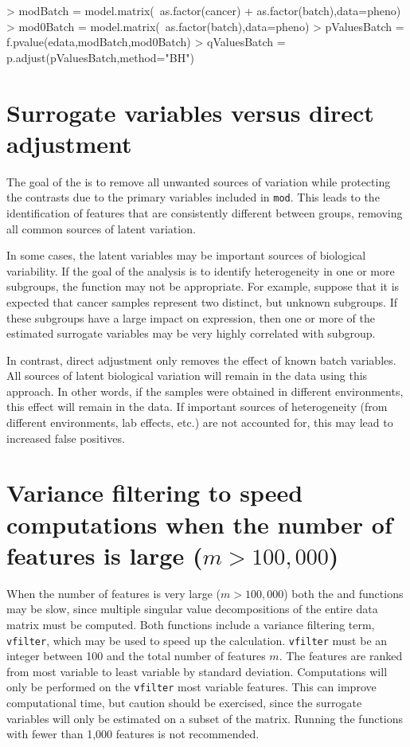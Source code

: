 \documentclass[12pt]{article}
\begin{document}
\begin{Schunk}
\begin{Sinput}
> modBatch = model.matrix(~as.factor(cancer) + as.factor(batch),data=pheno)
> mod0Batch = model.matrix(~as.factor(batch),data=pheno)
> pValuesBatch = f.pvalue(edata,modBatch,mod0Batch)
> qValuesBatch = p.adjust(pValuesBatch,method="BH")
\end{Sinput}
\end{Schunk}

\section{Surrogate variables versus direct adjustment}

The goal of the  is to remove all unwanted sources of variation while protecting the contrasts due to the primary variables included in \texttt{mod}. This leads to the identification of features that are consistently different between groups, removing all common sources of latent variation. 

In some cases, the latent variables may be important sources of biological variability. If the goal of the analysis is to identify heterogeneity in one or more subgroups, the  function may not be appropriate. For example, suppose that it is expected that cancer samples represent two distinct, but unknown subgroups. If these subgroups have a large impact on expression, then one or more of the estimated surrogate variables may be very highly correlated with subgroup. 

In contrast, direct adjustment only removes the effect of known batch variables. All sources of latent biological variation will remain in the data using this approach. In other words, if the samples were obtained in different environments, this effect will remain in the data. If important sources of heterogeneity (from different environments, lab effects, etc.) are not accounted for, this may lead to increased false positives. 



\section{Variance filtering to speed computations when the number of features is large ($m >100,000$)}

When the number of features is very large ($m > 100,000$) both the  and  functions may be slow, since multiple singular value decompositions of the entire data matrix must be computed. Both functions include a variance filtering term, \texttt{vfilter}, which may be used to speed up the calculation. \texttt{vfilter} must be an integer between 100 and the total number of features $m$. The features are ranked from most variable to least variable by standard deviation. Computations will only be performed on the \texttt{vfilter} most variable features. This can improve computational time, but caution should be exercised, since the surrogate variables will only be estimated on a subset of the matrix. Running the functions with fewer than 1,000 features is not recommended. 
\end{document}
